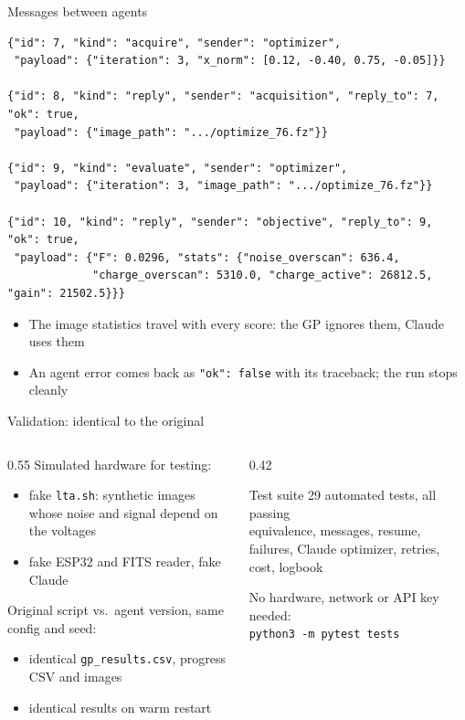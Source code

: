 \documentclass[aspectratio=169,10pt]{beamer}
\begin{document}
\begin{frame}[fragile]{Messages between agents}
\begin{lstlisting}
{"id": 7, "kind": "acquire", "sender": "optimizer",
 "payload": {"iteration": 3, "x_norm": [0.12, -0.40, 0.75, -0.05]}}

{"id": 8, "kind": "reply", "sender": "acquisition", "reply_to": 7, "ok": true,
 "payload": {"image_path": ".../optimize_76.fz"}}

{"id": 9, "kind": "evaluate", "sender": "optimizer",
 "payload": {"iteration": 3, "image_path": ".../optimize_76.fz"}}

{"id": 10, "kind": "reply", "sender": "objective", "reply_to": 9, "ok": true,
 "payload": {"F": 0.0296, "stats": {"noise_overscan": 636.4,
             "charge_overscan": 5310.0, "charge_active": 26812.5, "gain": 21502.5}}}
\end{lstlisting}
  \small
  \begin{itemize}
    \item The image statistics travel with every score: the GP ignores them, Claude uses them
    \item An agent error comes back as \texttt{"ok": false} with its traceback; the run stops cleanly
  \end{itemize}
\end{frame}

\begin{frame}{Validation: identical to the original}
  \begin{columns}[T]
    \begin{column}{0.55\textwidth}
      Simulated hardware for testing:
      \begin{itemize}\small
        \item fake \texttt{lta.sh}: synthetic images whose noise and signal depend on the voltages
        \item fake ESP32 and FITS reader, fake Claude
      \end{itemize}
      Original script vs.\ agent version, same config and seed:
      \begin{itemize}\small
        \item identical \texttt{gp\_results.csv}, progress CSV and images
        \item identical results on warm restart
      \end{itemize}
    \end{column}
    \begin{column}{0.42\textwidth}
      \begin{block}{Test suite}
        \small 29 automated tests, all passing\\[1mm]
        equivalence, messages, resume, failures, Claude optimizer, retries, cost,
        logbook
      \end{block}
      \vspace{2mm}
      {\scriptsize No hardware, network or API key needed:\\
       \texttt{python3 -m pytest tests}}
    \end{column}
  \end{columns}
\end{frame}
\end{document}
